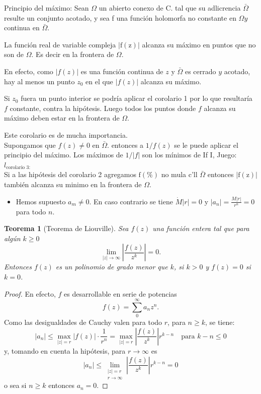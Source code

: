 \documentclass[10pt]{article}
\theoremstyle{plain}
\newtheorem{theorem}{Teorema}[section]
\theoremstyle{definition}
\theoremstyle{remark}
\begin{document}
Principio del máximo: Sean $\Omega$ un abierto conexo de C. tal que su adlicrencia $\bar{\Omega}$ resulte un conjunto acotado, y sea f una función holomorfa no constante en $\Omega y$ continua en $\bar{\Omega}$.

La función real de variable compleja $|\mathrm{f}(\mathrm{z})|$ alcanza su máximo en puntos que no son de $\Omega$. Es decir en la frontera de $\Omega$.

En efecto, como $|f(z)|$ es una función continua de $z$ y $\bar{\Omega}$ es cerrado $y$ acotado, hay al menos un punto $z_{0}$ en el que $|f(z)|$ alcanza su máximo.

Si $z_{0}$ fuera un punto interior se podría aplicar el corolario 1 por lo que resultaría $f$ constante, contra la hipótesis. Luego todos los puntos donde $f$ alcanza su máximo deben estar en la frontera de $\Omega$.

Este corolario es de mucha importancia.\\
Supongamos que $f(z) \neq 0$ en $\bar{\Omega}$. entonces a $1 / f(z)$ se le puede aplicar el principio del máximo. Los máximos de $1 /|f|$ son los mínimos de If I, Juego:\\
$l_{\text {corolario 3: }}$\\
Si a las hipótesis del corolario 2 agregamos $\mathrm{f}(\%)$ no mula c'll $\bar{\Omega}$ entonces $|\mathrm{f}(\mathrm{z})|$ también alcanza su minimo en la frontera de $\Omega$.

\begin{itemize}
  \item Hemos supuesto $a_{m} \neq 0$. En caso contrario se tiene $\dot{M}|r|=0$ y $\left|a_{n}\right|= \frac{M|r|}{r^{n}}=0$ para todo $n$.
\end{itemize}

\begin{theorem}[Teorema de Liouville]
Sea $f(z)$ una función entera tal que para algún $k \geq 0$
$$\lim_{|z| \rightarrow \infty}\left|\frac{f(z)}{z^{k}}\right|=0.$$
Entonces $f(z)$ es un polinomio de grado menor que $k$, si $k>0$ y $f(z)=0$ si $k=0$.
\end{theorem}

\begin{proof}
En efecto, $f$ es desarrollable en serie de potencias
$$f(z)=\sum_{0}^{\infty} a_{n} z^{n}.$$
Como las desigualdades de Cauchy valen para todo $r$, para $n \geq k$, se tiene:
$$\left|a_{n}\right| \leq \max_{|z|=r}|f(z)| \cdot \frac{1}{r^{n}}=\max_{|z|=r}\left|\frac{f(z)}{z^{k}}\right| r^{k-n} \quad \text{para } k-n \leq 0$$
y, tomando en cuenta la hipótesis, para $r \rightarrow \infty$ es
$$\left|a_{n}\right| \leq \lim_{\substack{|z|=r \\ r \rightarrow \infty}}\left|\frac{f(z)}{z^{k}}\right| r^{k-n}=0$$
o sea si $n \geq k$ entonces $a_{n}=0$.
\end{proof}
\end{document}
